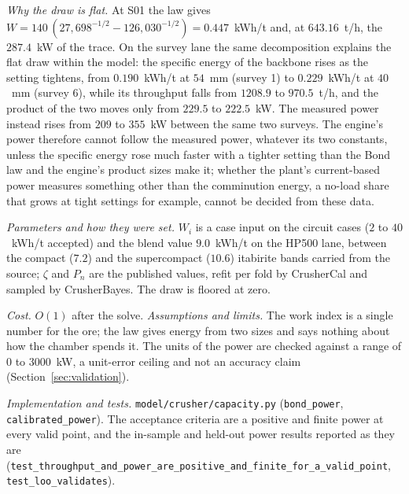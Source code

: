 \emph{Why the draw is flat.} At S01 the law gives $W=140\,(27{,}698^{-1/2}-126{,}030^{-1/2})=0.447$~kWh/t and, at $643.16$~t/h, the
$287.4$~kW of the trace. On the survey lane the same decomposition explains the flat draw within the model: the specific energy of the
backbone rises as the setting tightens, from $0.190$~kWh/t at $54$~mm (survey 1) to $0.229$~kWh/t at $40$~mm (survey 6), while its throughput
falls from $1208.9$ to $970.5$~t/h, and the product of the two moves only from $229.5$ to $222.5$~kW. The measured power instead rises from
$209$ to $355$~kW between the same two surveys. The engine's power therefore cannot follow the measured power, whatever its two constants, unless
the specific energy rose much faster with a tighter setting than the Bond law and the engine's product sizes make it; whether the plant's
current-based power measures something other than the comminution energy, a no-load share that grows at tight settings for example, cannot be
decided from these data.

\emph{Parameters and how they were set.} $W_i$ is a case input on the circuit cases ($2$ to $40$~kWh/t accepted) and the blend value
$9.0$~kWh/t on the HP500 lane, between the compact ($7.2$) and the supercompact ($10.6$) itabirite bands carried from the source; $\zeta$
and $P_n$ are the published values, refit per fold by CrusherCal and sampled by CrusherBayes. The draw is floored at zero.

\emph{Cost.} $O(1)$ after the solve. \emph{Assumptions and limits.} The work index is a single number for the ore; the law gives energy
from two sizes and says nothing about how the chamber spends it. The units of the power are checked against a range of $0$ to $3000$~kW,
a unit-error ceiling and not an accuracy claim (Section~\ref{sec:validation}).

\emph{Implementation and tests.} \texttt{model/\allowbreak{}crusher/\allowbreak{}capacity.py} (\texttt{bond\_power}, \texttt{calibrated\_power}). The acceptance
criteria are a positive and finite power at every valid point, and the in-sample and held-out power results reported as they are
(\texttt{test\_throughput\_and\_power\_are\_positive\_and\_finite\_for\_a\_valid\_point}, \texttt{test\_loo\_validates}).

\begin{table}[!t]
\centering
\caption{In-sample power of the calibrated engine against the ten measured powers: the constant mean, the bare Bond draw, the
published current-based form applied to the Bond draw, and that form refit on the ten surveys. Generated from \texttt{loo.json}.}
\label{tab:power-parity}
\footnotesize

\end{table}

